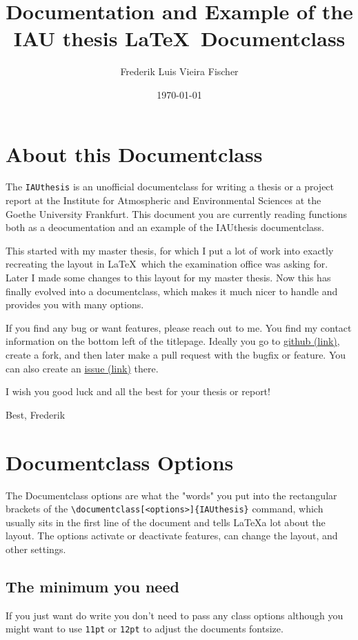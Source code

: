 \documentclass[12pt, todonotes, nodeclaration, oneside, fancypagenumbers, notof, notot, noabstract]{IAUthesis}
\title{Documentation and Example of the\\IAU thesis \LaTeX~Documentclass}
\author{Frederik Luis Vieira Fischer}
\date{\today}
\newcommand{\code}[1]{\colorbox{black!10!white}{\texttt{#1}}}
\begin{document}
\maketitle\glsresetall
\chapter{About this Documentclass}
The \code{IAUthesis} is an unofficial documentclass for writing a thesis or a project report at the Institute for Atmospheric and Environmental Sciences at the Goethe University Frankfurt. This document you are currently reading functions both as a deocumentation and an example of the IAUthesis documentclass.\medskip

This started with my master thesis, for which I put a lot of work into exactly recreating the layout in \LaTeX~which the examination office was asking for. Later I made some changes to this layout for my master thesis. Now this has finally evolved into a documentclass, which makes it much nicer to handle and provides you with many options.\medskip

If you find any bug or want features, please reach out to me. You find my contact information on the bottom left of the titlepage. Ideally you go to \href{https://github.com/FrederikVF/IAUthesis}{github (link)}, create a fork, and then later make a pull request with the bugfix or feature. You can also create an \href{https://github.com/FrederikVF/IAUthesis/issues}{issue (link)} there.\bigskip

\noindent I wish you good luck and all the best for your thesis or report!\smallskip

Best, Frederik

\chapter{Documentclass Options}
The Documentclass options are what the "words" you put into the rectangular brackets of the \verb|\documentclass[<options>]{IAUthesis}| command, which usually sits in the first line of the document and tells \LaTeX a lot about the layout. The options activate or deactivate features, can change the layout, and other settings.

\section{The minimum you need}
If you just want do write you don't need to pass any class options although you might want to use \code{11pt} or \code{12pt} to adjust the documents fontsize.
\end{document}
